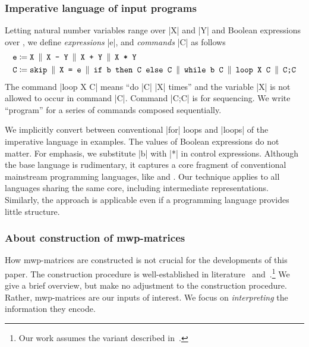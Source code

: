 \subsubsection{Imperative language of input programs}
\label{subsec:imp-language}

\begin{definition}
\label{def:lang}
Letting natural number variables range over \pr|X| and \pr|Y| and Boolean
expressions over , we define \emph{expressions} \pr|e|, and
\emph{commands} \pr|C| as follows
\begin{align*}
    \text{\pr|e|} \coloneqq{ }&
    \text{\pr| X|} \BNF
    \text{\pr|X - Y|} \BNF
    \text{\pr|X + Y|} \BNF
    \text{\pr|X * Y|} \\
    \text{\pr|C|} \coloneqq{ }&
    \text{\pr| skip|} \BNF
    \text{\pr|X = e|} \BNF
    \text{\pr|if b then C else C|} \BNF
    \text{\pr|while b C|} \BNF
    \text{\pr|loop X C|} \BNF
    \text{\pr|C;C|}
\end{align*}
The command \pr|loop X C| means \enquote{do \pr|{C}| \pr|X| times} and the
variable \pr|X| is not allowed to occur in command \pr|C|. Command \pr|C;C| is
for sequencing. We write \enquote{program} for a series of commands composed
sequentially. \end{definition} We implicitly convert between conventional
\prc|for| loops and \pr|loops| of the imperative language in examples. The
values of Boolean expressions do not matter. For emphasis, we substitute \pr|b|
with \pr|*| in control expressions. Although the base language is rudimentary,
it captures a core fragment of conventional mainstream programming languages,
like  and . Our technique applies to all languages sharing the
same core, including intermediate representations. Similarly, the approach is applicable even if a programming
language provides little structure.

\subsubsection{About construction of mwp-matrices}
\label{subsec:matrices}

How mwp-matrices are constructed is not crucial for the
developments of this paper. The construction procedure is well-established in
literature~\cite[Sect. 5--6]{jones2009} and~\cite[Sect.
2--3]{aubert20222}.\footnote{Our work assumes the variant described
in~\cite{aubert20222}.} We give a brief overview, but make no adjustment to the
construction procedure. Rather, mwp-matrices are our inputs of
interest. We focus on \emph{interpreting} the information they encode.

